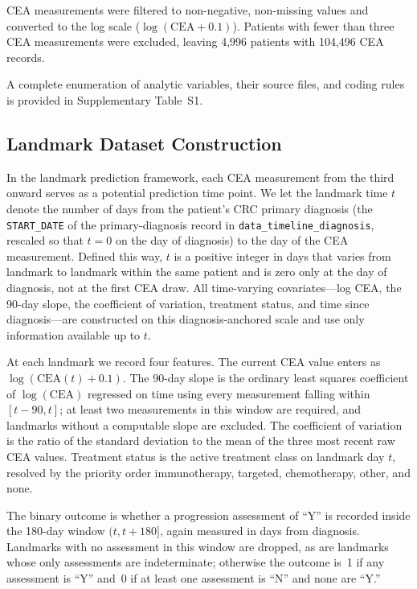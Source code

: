 \documentclass[11pt]{article}
\begin{document}
CEA measurements were filtered to non-negative, non-missing values and converted to the log scale ($\log(\text{CEA} + 0.1)$). Patients with fewer than three CEA measurements were excluded, leaving 4,996 patients with 104,496 CEA records.

A complete enumeration of analytic variables, their source files, and coding rules is provided in Supplementary Table~S1.

\subsection*{Landmark Dataset Construction}

In the landmark prediction framework, each CEA measurement from the third onward serves as a potential prediction time point. We let the landmark time $t$ denote the number of days from the patient's CRC primary diagnosis (the \texttt{START\_DATE} of the primary-diagnosis record in \texttt{data\_timeline\_diagnosis}, rescaled so that $t = 0$ on the day of diagnosis) to the day of the CEA measurement. Defined this way, $t$ is a positive integer in days that varies from landmark to landmark within the same patient and is zero only at the day of diagnosis, not at the first CEA draw. All time-varying covariates---log CEA, the 90-day slope, the coefficient of variation, treatment status, and time since diagnosis---are constructed on this diagnosis-anchored scale and use only information available up to $t$.

At each landmark we record four features. The current CEA value enters as $\log(\text{CEA}(t) + 0.1)$. The 90-day slope is the ordinary least squares coefficient of $\log(\text{CEA})$ regressed on time using every measurement falling within $[t-90, t]$; at least two measurements in this window are required, and landmarks without a computable slope are excluded. The coefficient of variation is the ratio of the standard deviation to the mean of the three most recent raw CEA values. Treatment status is the active treatment class on landmark day $t$, resolved by the priority order immunotherapy, targeted, chemotherapy, other, and none.

The binary outcome is whether a progression assessment of ``Y'' is recorded inside the 180-day window $(t, t+180]$, again measured in days from diagnosis. Landmarks with no assessment in this window are dropped, as are landmarks whose only assessments are indeterminate; otherwise the outcome is~1 if any assessment is ``Y'' and~0 if at least one assessment is ``N'' and none are ``Y.''
\end{document}
